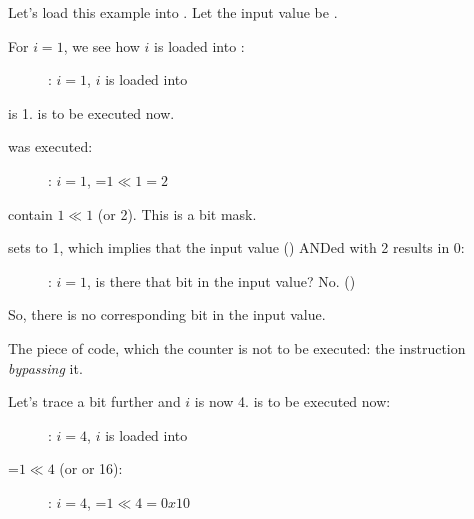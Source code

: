 ﻿\clearpage
\myparagraphold{\olly}
\myindex{\olly}

Let's load this example into \olly. 
Let the input value be .

For $i=1$, we see how $i$ is loaded into \ECX: 

\begin{figure}[H]
\centering
{}
\caption{\olly: $i=1$, $i$ is loaded into \ECX}
\label{fig:shifts_olly1_1}
\end{figure}

\EDX is 1. \SHL is to be executed now.

\clearpage
\SHL was executed:

\begin{figure}[H]
\centering
{}
\caption{\olly: $i=1$, \EDX=$1 \ll 1=2$}
\label{fig:shifts_olly1_2}
\end{figure}

\EDX contain $1 \ll 1$ (or 2). This is a bit mask.

\clearpage
\AND sets \ZF to 1, which implies that the input value ()  ANDed with 2 results in 0:

\begin{figure}[H]
\centering
{}
\caption{\olly: $i=1$, 
is there that bit in the input value? No. ()}
\label{fig:shifts_olly1_3}
\end{figure}

So, there is no corresponding bit in the input value.

The piece of code, which  the counter is not to be executed: 
the \JZ instruction \emph{bypassing} it.

\clearpage
Let's trace a bit further and $i$ is now 4.
\SHL is to be executed now:

\begin{figure}[H]
\centering
{}
\caption{\olly: $i=4$, $i$ is loaded into \ECX}
\label{fig:shifts_olly4_1}
\end{figure}

\clearpage
\EDX=$1 \ll 4$ (or  or 16): 

\begin{figure}[H]
\centering
{}
\caption{\olly: $i=4$, \EDX=$1 \ll 4=0x10$}
\label{fig:shifts_olly4_2}
\end{figure}

